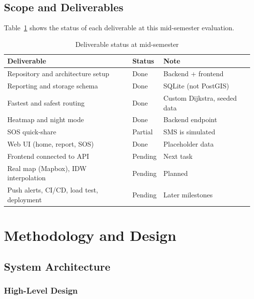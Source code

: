 \documentclass{tietreport}
\begin{document}
\section{Scope and Deliverables}

Table~\ref{tab:status} shows the status of each deliverable at this
mid-semester evaluation.

\begin{table}[h]
\centering
\small
\begin{tabular}{|p{6cm}|l|p{5cm}|}
  \hline
  \textbf{Deliverable} & \textbf{Status} & \textbf{Note} \\ \hline
  Repository and architecture setup & Done & Backend + frontend \\ \hline
  Reporting and storage schema & Done & SQLite (not PostGIS) \\ \hline
  Fastest and safest routing & Done & Custom Dijkstra, seeded data \\ \hline
  Heatmap and night mode & Done & Backend endpoint \\ \hline
  SOS quick-share & Partial & SMS is simulated \\ \hline
  Web UI (home, report, SOS) & Done & Placeholder data \\ \hline
  Frontend connected to API & Pending & Next task \\ \hline
  Real map (Mapbox), IDW interpolation & Pending & Planned \\ \hline
  Push alerts, CI/CD, load test, deployment & Pending & Later milestones \\ \hline
\end{tabular}
\caption{Deliverable status at mid-semester}
\label{tab:status}
\end{table}

\chapter{Methodology and Design}

\section{System Architecture}

\subsection{High-Level Design}
\end{document}
